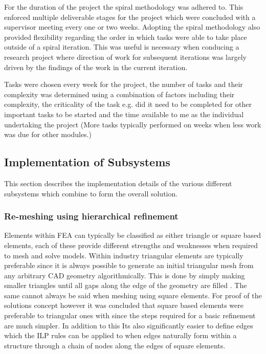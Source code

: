 \documentclass{article}
\begin{document}
For the duration of the project the spiral methodology was adhered to. This enforced multiple deliverable stages for the project which were concluded with a supervisor meeting every one or two weeks. Adopting the spiral methodology also provided flexibility regarding the order in which tasks were able to take place outside of a spiral iteration. This was useful is necessary when conducing a research project where direction of work for subsequent iterations was largely driven by the findings of the work in the current iteration.

Tasks were chosen every week for the project, the number of tasks and their complexity was determined using a combination of factors including their complexity, the criticality of the task e.g. did it need to be completed for other important tasks to be started and the time available to me as the individual undertaking the project (More tasks typically performed on weeks when less work was due for other modules.) 



\subsection{Implementation of Subsystems}
This section describes the implementation details of the various different subsystems which combine to form the overall solution.

\subsubsection{Re-meshing using hierarchical refinement}
Elements within FEA can typically be classified as either triangle or square based elements, each of these provide different strengths and weaknesses when required to mesh and solve models. Within industry triangular elements are typically preferable since it is always possible to generate an initial triangular mesh from any arbitrary CAD geometry algorithmically. This is done by simply making smaller triangles until all gaps along the edge of the geometry are filled \cite{}. The same cannot always be said  when meshing using square elements. For proof of the solutions concept however it was concluded that square based elements were preferable to triangular ones with since the steps required for a basic refinement are much simpler. In addition to this Its also significantly easier to define edges which the ILP rules can be applied to when edges naturally form within a structure through a chain of nodes along the edges of square elements.
\end{document}
